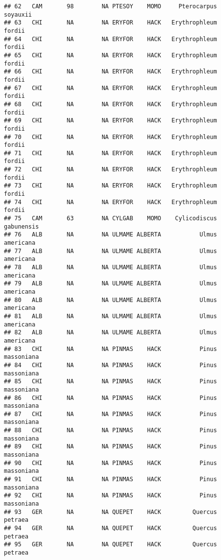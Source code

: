 \documentclass[]{article}
\begin{document}
\begin{verbatim}
## 62   CAM       98        NA PTESOY    MOMO     Pterocarpus       soyauxii
## 63   CHI       NA        NA ERYFOR    HACK   Erythrophleum         fordii
## 64   CHI       NA        NA ERYFOR    HACK   Erythrophleum         fordii
## 65   CHI       NA        NA ERYFOR    HACK   Erythrophleum         fordii
## 66   CHI       NA        NA ERYFOR    HACK   Erythrophleum         fordii
## 67   CHI       NA        NA ERYFOR    HACK   Erythrophleum         fordii
## 68   CHI       NA        NA ERYFOR    HACK   Erythrophleum         fordii
## 69   CHI       NA        NA ERYFOR    HACK   Erythrophleum         fordii
## 70   CHI       NA        NA ERYFOR    HACK   Erythrophleum         fordii
## 71   CHI       NA        NA ERYFOR    HACK   Erythrophleum         fordii
## 72   CHI       NA        NA ERYFOR    HACK   Erythrophleum         fordii
## 73   CHI       NA        NA ERYFOR    HACK   Erythrophleum         fordii
## 74   CHI       NA        NA ERYFOR    HACK   Erythrophleum         fordii
## 75   CAM       63        NA CYLGAB    MOMO    Cylicodiscus     gabunensis
## 76   ALB       NA        NA ULMAME ALBERTA           Ulmus      americana
## 77   ALB       NA        NA ULMAME ALBERTA           Ulmus      americana
## 78   ALB       NA        NA ULMAME ALBERTA           Ulmus      americana
## 79   ALB       NA        NA ULMAME ALBERTA           Ulmus      americana
## 80   ALB       NA        NA ULMAME ALBERTA           Ulmus      americana
## 81   ALB       NA        NA ULMAME ALBERTA           Ulmus      americana
## 82   ALB       NA        NA ULMAME ALBERTA           Ulmus      americana
## 83   CHI       NA        NA PINMAS    HACK           Pinus     massoniana
## 84   CHI       NA        NA PINMAS    HACK           Pinus     massoniana
## 85   CHI       NA        NA PINMAS    HACK           Pinus     massoniana
## 86   CHI       NA        NA PINMAS    HACK           Pinus     massoniana
## 87   CHI       NA        NA PINMAS    HACK           Pinus     massoniana
## 88   CHI       NA        NA PINMAS    HACK           Pinus     massoniana
## 89   CHI       NA        NA PINMAS    HACK           Pinus     massoniana
## 90   CHI       NA        NA PINMAS    HACK           Pinus     massoniana
## 91   CHI       NA        NA PINMAS    HACK           Pinus     massoniana
## 92   CHI       NA        NA PINMAS    HACK           Pinus     massoniana
## 93   GER       NA        NA QUEPET    HACK         Quercus        petraea
## 94   GER       NA        NA QUEPET    HACK         Quercus        petraea
## 95   GER       NA        NA QUEPET    HACK         Quercus        petraea

\end{verbatim}
\end{document}
